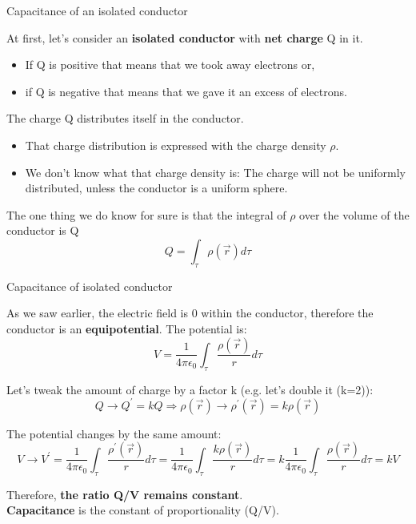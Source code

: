%
%
%

\begin{frame}{Capacitance of an isolated conductor}

At first, let's consider an {\bf isolated conductor} with {\bf net charge} Q in it.
\begin{itemize}
  \item If Q is positive that means that we took away electrons or,
  \item if Q is negative that means that we gave it an excess of electrons.
\end{itemize}

\vspace{0.3cm}

The charge Q distributes itself in the conductor.
\begin{itemize}
  \item That charge distribution is expressed with the charge density $\rho$.
  \item We don't know what that charge density is:
        The charge will not be uniformly distributed, unless the conductor is a uniform sphere.
\end{itemize}

\vspace{0.3cm}

The one thing we do know for sure is that the integral of $\rho$ over the volume of the conductor is Q
\begin{equation*}
  Q = \int_{\tau} \rho(\vec{r})d\tau
\end{equation*}

\end{frame}

%
%
%

\begin{frame}{Capacitance of isolated conductor}

As we saw earlier, the electric field is 0 within the conductor, therefore
the conductor is an {\bf equipotential}. The potential is:
\begin{equation*}
  V = \frac{1}{4\pi\epsilon_0} \int_{\tau} \frac{\rho(\vec{r})}{r} d\tau
\end{equation*}

Let's tweak the amount of charge by a factor k (e.g. let's double it (k=2)):
\begin{equation*}
  Q \rightarrow Q^{\prime} = k Q \Rightarrow
  \rho(\vec{r}) \rightarrow \rho^{\prime}(\vec{r}) = k \rho(\vec{r})
\end{equation*}

The potential changes by the same amount:
\begin{equation*}
  V \rightarrow V^{\prime} =
    \frac{1}{4\pi\epsilon_0} \int_{\tau} \frac{\rho^{\prime}(\vec{r})}{r} d\tau =
    \frac{1}{4\pi\epsilon_0} \int_{\tau} \frac{k \rho(\vec{r})}{r} d\tau =
    k \frac{1}{4\pi\epsilon_0} \int_{\tau} \frac{\rho(\vec{r})}{r} d\tau =
    k V
\end{equation*}

Therefore, {\bf the ratio Q/V remains constant}.\\
{\bf Capacitance} is the constant of proportionality (Q/V).

\end{frame}


